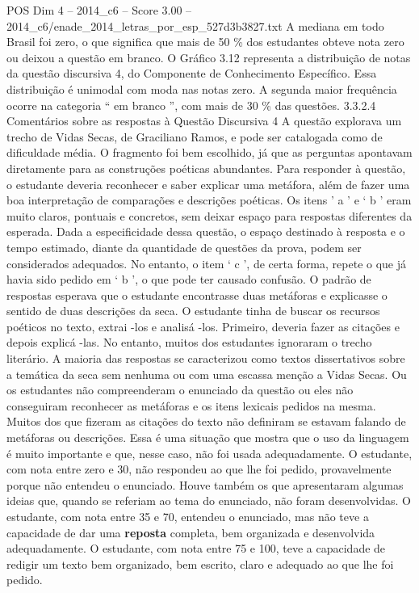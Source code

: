 \begin{textsample}{POS Dim 4 – 2014\_c6 – Score 3.00 – 2014\_c6/enade\_2014\_letras\_por\_esp\_527d3b3827.txt}
A mediana em todo Brasil foi zero, o que significa que mais de 50 \% dos estudantes obteve nota zero ou deixou a questão em branco.
O Gráfico 3.12 representa a distribuição de notas da questão discursiva 4, do Componente de Conhecimento Específico.
Essa distribuição é unimodal com moda nas notas zero.
A segunda maior frequência ocorre na categoria “ em branco ”, com mais de 30 \% das questões. 3.3.2.4 Comentários sobre as respostas à Questão Discursiva 4 A questão explorava um trecho de Vidas Secas, de Graciliano Ramos, e pode ser catalogada como de dificuldade média.
O fragmento foi bem escolhido, já que as perguntas apontavam diretamente para as construções poéticas abundantes.
Para responder à questão, o estudante deveria reconhecer e saber explicar uma metáfora, além de fazer uma boa interpretação de comparações e descrições poéticas.
Os itens ’ a ’ e ‘ b ’ eram muito claros, pontuais e concretos, sem deixar espaço para respostas diferentes da esperada.
Dada a especificidade dessa questão, o espaço destinado à resposta e o tempo estimado, diante da quantidade de questões da prova, podem ser considerados adequados.
No entanto, o item ‘ c ’, de certa forma, repete o que já havia sido pedido em ‘ b ’, o que pode ter causado confusão.
O padrão de respostas esperava que o estudante encontrasse duas metáforas e explicasse o sentido de duas descrições da seca.
O estudante tinha de buscar os recursos poéticos no texto, extrai -los e analisá -los.
Primeiro, deveria fazer as citações e depois explicá -las.
No entanto, muitos dos estudantes ignoraram o trecho literário.
A maioria das respostas se caracterizou como textos dissertativos sobre a temática da seca sem nenhuma ou com uma escassa menção a Vidas Secas.
Ou os estudantes não compreenderam o enunciado da questão ou eles não conseguiram reconhecer as metáforas e os itens lexicais pedidos na mesma.
Muitos dos que fizeram as citações do texto não definiram se estavam falando de metáforas ou descrições.
Essa é uma situação que mostra que o uso da linguagem é muito importante e que, nesse caso, não foi usada adequadamente.
O estudante, com nota entre zero e 30, não respondeu ao que lhe foi pedido, provavelmente porque não entendeu o enunciado.
Houve também os que apresentaram algumas ideias que, quando se referiam ao tema do enunciado, não foram desenvolvidas.
O estudante, com nota entre 35 e 70, entendeu o enunciado, mas não teve a capacidade de dar uma \textbf{reposta} completa, bem organizada e desenvolvida adequadamente.
O estudante, com nota entre 75 e 100, teve a capacidade de redigir um texto bem organizado, bem escrito, claro e adequado ao que lhe foi pedido.

\end{textsample}
